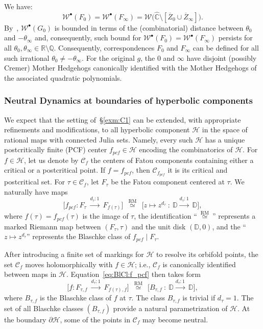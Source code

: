 \documentclass{amsart}
\newcommand{\1}{{\mathbb 1 }}
\newcommand{\Width}{{\mathcal W}}
\newcommand\HH{\mathcal{H}}%
\newcommand{\wC}{\widehat{\mathbb{C}}}
\newcommand{\Q}{\mathbb{Q}}
\newcommand{\R}{\mathbb{R}}
\newcommand{\Disk}{\mathbb{D}}
\theoremstyle{remark}
\numberwithin{equation}{section}
\theoremstyle{definition}
\begin{document}
 We have:
\begin{equation}
\label{eq:Width:F_0}
\Width^\bullet(F_0) =\Width^\bullet(F_\infty)=\Width\big(\wC\setminus [\overline Z_0\cup \overline Z_\infty]\big).
\end{equation}
By~\cite{DL:HypComp},  $\Width^\bullet(G_0) $ is bounded in terms of the (combinatorial) distance between $\theta_0$ and $-\theta_\infty$ and, consequently, such bound for $\Width^\bullet(F_0)=\Width^\bullet(F_\infty)$ persists for all  $\theta_0,\theta_\infty \in \R\setminus \Q$. Consequently, correspondences $F_0$ and $F_\infty$ can be defined for all such irrational $\theta_0\not= -\theta_\infty$. For the original $g$, the $0$ and $\infty$ have disjoint (possibly Cremer) Mother Hedgehogs canonically identified with the Mother Hedgehogs of the associated quadratic polynomials.


\subsubsection{Neutral Dynamics at boundaries of hyperbolic components}\label{ss:exm:general} We expect that the setting of~\S\ref{exm:C1} can be extended, with appropriate refinements and modifications, to all hyperbolic component $\HH$ in the space of rational maps with connected Julia sets. Namely, every such $\HH$ has a unique postcritically finite (PCF) center $f_{pcf}\in \HH$ encoding the combinatorics of $\HH$. For $f\in \HH$, let us denote by $\mathcal C_f$ the centers of Fatou components containing either a critical or a postcritical point. If $f=f_{pcf}$, then $\mathcal C_{f_{pcf}}$ it is its critical and postcritical set. For $\tau\in \mathcal C_f$, let $F_\tau$ be the Fatou component centered at $\tau$. We naturally have maps
\begin{equation}
\label{eq:BlCl:f_pcf}
\big[f_{pcf}\colon F_\tau\ \overset{d_\tau:1}{\longrightarrow}\ F_{f(\tau)}\big] \ \ \overset{\text{RM}}{\simeq}\  \ \big[ z\mapsto z^{d_\tau}\ \colon \ \Disk \overset{d_\tau:1}{\longrightarrow}\ \Disk\big],
\end{equation}
where $f(\tau)=f_{pcf}(\tau)$ is the image of $\tau$, the identification ``$\ \overset{\text{RM}}{\simeq}\ $'' represents a marked Riemann map between $(F_\tau, \tau)$ and the unit disk $(\Disk, 0)$, and the ``$z\mapsto z^{d_\tau}$'' represents the Blaschke class of $f_{pcf}\mid F_\tau$.

After introducing a finite set of markings for $\HH$ to resolve its orbifold points, the set $\mathcal C_f$ moves holomorphically with $f\in \HH$; i.e., $\mathcal C_f$ is canonically identified between maps in $\mathcal H$. Equation~\eqref{eq:BlCl:f_pcf} then takes form
\begin{equation}
\label{eq:BlCl:f}
\big[f\colon F_{\tau,f}\ \overset{d_\tau:1}{\longrightarrow}\ F_{f(\tau),f}\big] \ \ \overset{\text{RM}}{\simeq}\  \ \big[ B_{\tau,f}\ \colon \ \Disk \overset{d_\tau:1}{\longrightarrow}\ \Disk\big],
\end{equation}
where $B_{\tau,f}$ is the Blaschke class of $f$ at $\tau$. The class $B_{\tau,f}$ is trivial if $d_\tau=1$. The set of all Blaschke classes $(B_{\tau,f})$ provide a natural parametrization of $\HH$. At the boundary $\partial \HH$, some of the points in $\mathcal C_f$ may become neutral. 
\end{document}
